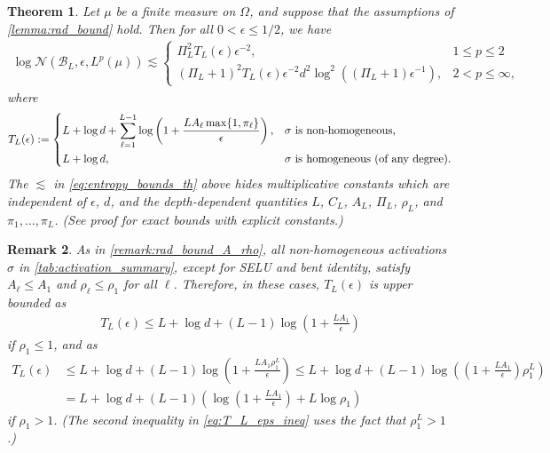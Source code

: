 \documentclass{article}
\def\cB{{\mathcal{B}}}
\def\cN{{\mathcal{N}}}
\newtheorem{theorem}{Theorem}[section]
\newtheorem{remark}[theorem]{Remark}
\begin{document}
\begin{theorem} \label{th:entropy_bound}
    Let $\mu$ be a finite measure on $\Omega$, and suppose that the assumptions of \cref{lemma:rad_bound} hold. Then for all $0 < \epsilon \leq 1/2$, we have
    \begin{align} \label{eq:entropy_bounds_th}
        \log \cN(\cB_L, \epsilon, L^p(\mu)) \lesssim \begin{cases}
            \Pi_L^2 T_L(\epsilon) \epsilon^{-2}, &1 \leq p \leq 2 \\ 
           (\Pi_L+1)^2 T_L(\epsilon) \epsilon^{-2} d^2 \log^2 \left( (\Pi_L + 1) \epsilon^{-1} \right)  , &2 < p \leq \infty, 
        \end{cases}
    \end{align}
    where
    \begin{align} \label{eq:T_eps}
        T_L(\epsilon) := \begin{dcases}
            L + \log d + \sum_{\ell=1}^{L-1} \log \left(1 + \frac{L A_\ell \max\{ 1, \pi_\ell \}}{\epsilon} \right), &\textrm{$\sigma$ is non-homogeneous,} \\
            L + \log d, &\textrm{$\sigma$ is homogeneous (of any degree).}
        \end{dcases}
    \end{align}
    The $\lesssim$ in \eqref{eq:entropy_bounds_th} above hides multiplicative constants which are independent of $\epsilon$, $d$, and the depth-dependent quantities $L$, $C_L$, $A_L$, $\Pi_L$, $\rho_L$, and $\pi_1, \dots, \pi_L$. (See proof for exact bounds with explicit constants.)
\end{theorem}
\begin{remark}
    As in \cref{remark:rad_bound_A_rho}, all non-homogeneous activations $\sigma$ in \cref{tab:activation_summary}, except for SELU and bent identity, satisfy $A_\ell \leq A_1$ and $\rho_\ell \leq \rho_1$ for all $\ell$. Therefore, in these cases, $T_L(\epsilon)$ is upper bounded as
    \begin{align} 
        T_L(\epsilon) \leq L + \log d + (L-1) \log \left(1 + \frac{L A_1}{\epsilon} \right)
    \end{align}
    if $\rho_1 \leq 1$, and as
    \begin{align} 
        T_L(\epsilon) &\leq 
        L + \log d + (L-1) \log \left(1 + \frac{L A_1 \rho_1^L}{\epsilon} \right) \leq L + \log d + (L-1) \log \left( \left( 1 + \frac{L A_1 }{\epsilon} \right) \rho_1^L \right) \label{eq:T_L_eps_ineq} \\
        &= L +  \log d + (L-1) \left( \log \left( 1 + \frac{L A_1 }{\epsilon} \right) + L \log \rho_1 \right) 
    \end{align}
    if $\rho_1 > 1$. (The second inequality in \eqref{eq:T_L_eps_ineq} uses the fact that $\rho_1^L > 1$.)
\end{remark}
\end{document}
